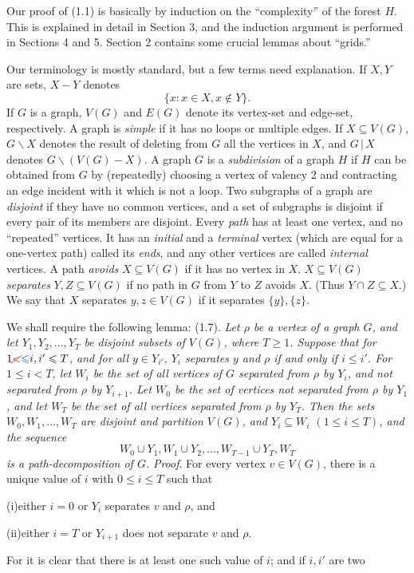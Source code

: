 Our proof of (1.1) is basically by induction on the ``complexity'' of the
forest $H$. This is explained in detail in Section 3, and the induction argument
is performed in Sections 4 and 5. Section 2 contains some crucial lemmas
about ``grids.''

Our terminology is mostly standard, but a few terms need explanation. If
$X, Y$ are sets, $X-Y$ denotes
\begin{equation*}
\{x\colon x\in X, x\notin Y\}.
\end{equation*}
If $G$ is a graph, $V(G)$ and $E(G)$ denote its vertex-set and edge-set, respectively.
A graph is \textit{simple} if it has no loops or multiple edges. If $X\subseteq V(G)$,
$G\backslash X$ denotes the result of deleting from $G$ all the vertices in $X$, and $G\,|\,X$
denotes $G\backslash(V(G)-X)$. A graph $G$ is a \textit{subdivision} of a graph $H$ if $H$ can be
obtained from $G$ by (repeatedly) choosing a vertex of valency 2 and
contracting an edge incident with it which is not a loop. Two subgraphs of a
graph are \textit{disjoint} if they have no common vertices, and a set of subgraphs is
disjoint if every pair of its members are disjoint. Every \textit{path} has at least one
vertex, and no ``repeated'' vertices. It has an \textit{initial} and a \textit{terminal} vertex
(which are equal for a one-vertex path) called its \textit{ends}, and any other vertices
are called \textit{internal} vertices. A path \textit{avoids} $X\subseteq V(G)$ if it has no vertex in $X$.
$X\subseteq V(G)$ \textit{separates} $Y, Z\subseteq V(G)$ if no path in $G$ from $Y$ to $Z$ avoids $X$.
(Thus $Y\cap Z\subseteq X$.) We say that $X$ separates $y, z\in V(G)$ if it separates
$\{y\}, \{z\}$.

We shall require the following lemma:
\stmt
(1.7). \textit{Let $\rho$ be a vertex of a graph $G$, and let $Y_1, Y_2,..., Y_T$ be disjoint
subsets of $V(G)$, where $T\ge 1$. Suppose that for $1\delm{<}\fix{\le} i, i'\le T$, and for all
$y\in Y_{i'}$, $Y_i$ separates $y$ and $\rho$ if and only if $i\le i'$. For $1\le i<T$, let $W_i$ be
the set of all vertices of $G$ separated from $\rho$ by $Y_i$, and not separated from $\rho$
by $Y_{i+1}$. Let $W_0$ be the set of vertices not separated from $\rho$ by $Y_1$, and let
$W_T$ be the set of all vertices separated from $\rho$ by $Y_T$. Then the sets
$W_0, W_1,..., W_T$ are disjoint and partition $V(G)$, and $Y_i\subseteq W_i$ $(1\le i\le T)$, and
the sequence}
\begin{equation*}
W_0\cup Y_1, W_1\cup Y_2,..., W_{T-1}\cup Y_T, W_T
\end{equation*}
\textit{is a path-decomposition of $G$.}
\stmt
\textit{Proof}. For every vertex $v\in V(G)$, there is a unique value of $i$ with
$0\le i\le T$ such that

\hspace*{12pt}(i)\enspace either $i=0$ or $Y_i$ separates $v$ and $\rho$, and

\hspace*{12pt}(ii)\enspace either $i=T$ or $Y_{i+1}$ does not separate $v$ and $\rho$.

\noindent For it is clear that there is at least one such value of $i$; and if $i, i'$ are two
